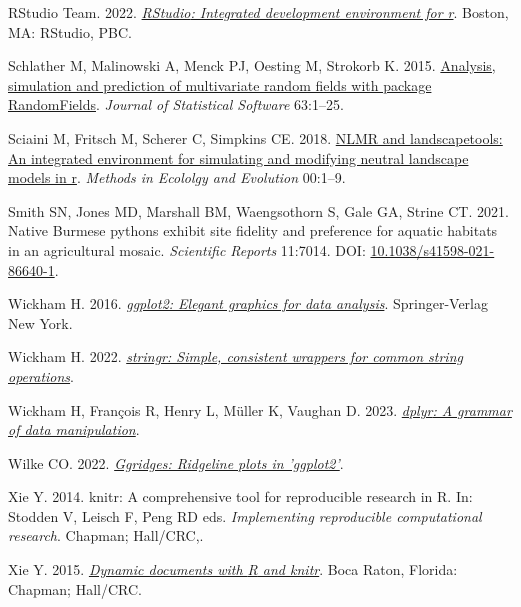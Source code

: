\documentclass[10pt,a4paper]{article}
\newlength{\cslhangindent}
\newlength{\cslentryspacingunit} %
\newenvironment{CSLReferences}[2] %
 {%
  \setlength{\parindent}{0pt}
  \ifodd #1
  \let\oldpar\par
  \def\par{\hangindent=\cslhangindent\oldpar}
  \fi
  \setlength{\parskip}{#2\cslentryspacingunit}
 }%
 {}
\begin{document}
\begin{CSLReferences}{1}{0}
\leavevmode{}%
RStudio Team. 2022. \emph{\href{http://www.rstudio.com/}{{RStudio}: Integrated development environment for r}}. Boston, MA: RStudio, PBC.

\leavevmode{}%
Schlather M, Malinowski A, Menck PJ, Oesting M, Strokorb K. 2015. \href{https://www.jstatsoft.org/v63/i08/}{Analysis, simulation and prediction of multivariate random fields with package {RandomFields}}. \emph{Journal of Statistical Software} 63:1--25.

\leavevmode{}%
Sciaini M, Fritsch M, Scherer C, Simpkins CE. 2018. \href{https://doi.org/10.1111/2041-210X.13076}{NLMR and landscapetools: An integrated environment for simulating and modifying neutral landscape models in r}. \emph{Methods in Ecololgy and Evolution} 00:1--9.

\leavevmode{}%
Smith SN, Jones MD, Marshall BM, Waengsothorn S, Gale GA, Strine CT. 2021. Native {Burmese} pythons exhibit site fidelity and preference for aquatic habitats in an agricultural mosaic. \emph{Scientific Reports} 11:7014. DOI: \href{https://doi.org/10.1038/s41598-021-86640-1}{10.1038/s41598-021-86640-1}.

\leavevmode{}%
Wickham H. 2016. \emph{\href{https://ggplot2.tidyverse.org}{ggplot2: Elegant graphics for data analysis}}. Springer-Verlag New York.

\leavevmode{}%
Wickham H. 2022. \emph{\href{https://CRAN.R-project.org/package=stringr}{{stringr}: Simple, consistent wrappers for common string operations}}.

\leavevmode{}%
Wickham H, François R, Henry L, Müller K, Vaughan D. 2023. \emph{\href{https://CRAN.R-project.org/package=dplyr}{{dplyr}: A grammar of data manipulation}}.

\leavevmode{}%
Wilke CO. 2022. \emph{\href{https://CRAN.R-project.org/package=ggridges}{Ggridges: Ridgeline plots in 'ggplot2'}}.

\leavevmode{}%
Xie Y. 2014. {knitr}: A comprehensive tool for reproducible research in {R}. In: Stodden V, Leisch F, Peng RD eds. \emph{Implementing reproducible computational research}. Chapman; Hall/CRC,.

\leavevmode{}%
Xie Y. 2015. \emph{\href{https://yihui.org/knitr/}{Dynamic documents with {R} and knitr}}. Boca Raton, Florida: Chapman; Hall/CRC.


\end{CSLReferences}
\end{document}
